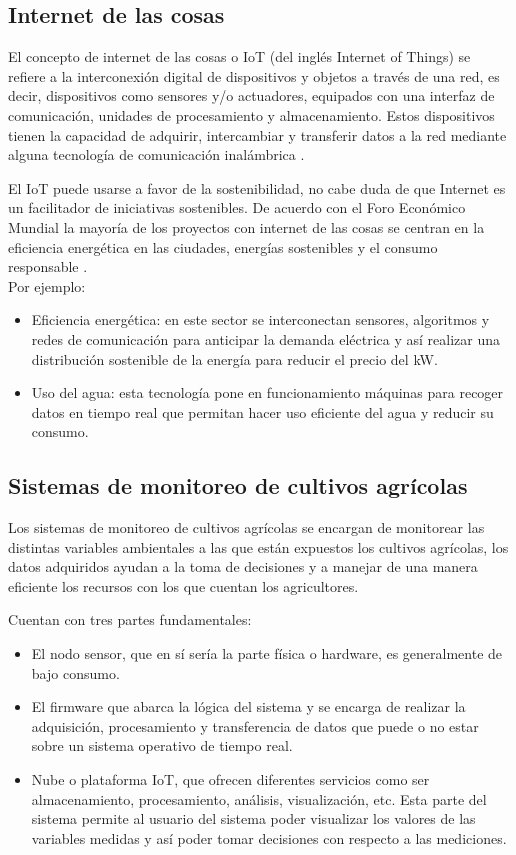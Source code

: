 \subsection{Internet de las cosas}
El concepto de internet de las cosas o IoT (del inglés Internet of Things) se refiere a la interconexión digital de dispositivos y objetos a través de una red, es decir, dispositivos como sensores y/o actuadores, equipados con una interfaz de comunicación, unidades de procesamiento y almacenamiento. Estos dispositivos tienen la capacidad de adquirir, intercambiar y transferir datos a la red mediante alguna tecnología de comunicación inalámbrica \citep{WirelessComunications}.

El IoT puede usarse a favor de la sostenibilidad, no cabe duda de que Internet es un facilitador de iniciativas sostenibles. De acuerdo con el Foro Económico Mundial la mayoría de los proyectos con internet de las cosas se centran en la eficiencia energética en las ciudades, energías sostenibles y el consumo responsable \citep{InternetDeLasCosas}. 
\\Por ejemplo:
\begin{itemize}
  \item Eficiencia energética: en este sector se interconectan sensores, algoritmos y redes de comunicación para anticipar la demanda eléctrica y así realizar una distribución sostenible de la energía para reducir el precio del kW.
  \item Uso del agua: esta tecnología pone en funcionamiento máquinas para recoger datos en tiempo real que permitan hacer uso eficiente del agua y reducir su consumo.
  
\end{itemize}

\subsection{Sistemas de monitoreo de cultivos agrícolas}
Los sistemas de monitoreo de cultivos agrícolas se encargan de monitorear
las distintas variables ambientales a las que están expuestos los cultivos agrícolas, los datos adquiridos ayudan a la toma de decisiones y a manejar de una manera eficiente los recursos con los que cuentan los agricultores.

Cuentan con tres partes fundamentales: 
\begin{itemize}
  \item El nodo sensor, que en sí sería la parte física o hardware, es generalmente de bajo consumo.
  \item El firmware que abarca la lógica del sistema y se encarga de realizar la adquisición, procesamiento y transferencia de datos que puede o no estar sobre un sistema operativo de tiempo real.
  \item Nube o plataforma IoT, que ofrecen diferentes servicios como ser almacenamiento, procesamiento, análisis, visualización, etc. Esta parte del sistema permite al usuario del sistema poder visualizar los valores de las variables medidas y así poder tomar decisiones con respecto a las mediciones.
\end{itemize}

